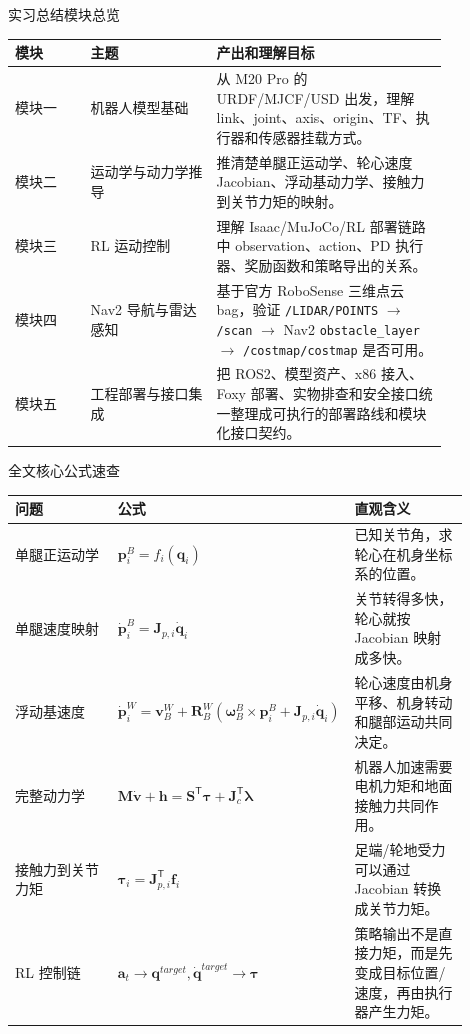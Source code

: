 \documentclass[UTF8,11pt,a4paper]{ctexart}
\newcommand{\T}{^{\mathsf T}}
\newcommand{\bs}[1]{\bm{#1}}
\begin{document}
\begin{conceptbox}{实习总结模块总览}
\begin{center}
\renewcommand{\arraystretch}{1.25}
\begin{tabular}{p{0.15\linewidth}p{0.25\linewidth}p{0.46\linewidth}}
\toprule
\textbf{模块} & \textbf{主题} & \textbf{产出和理解目标}\\
\midrule
模块一 & 机器人模型基础 &
从 M20 Pro 的 URDF/MJCF/USD 出发，理解 link、joint、axis、origin、TF、执行器和传感器挂载方式。\\
模块二 & 运动学与动力学推导 &
推清楚单腿正运动学、轮心速度 Jacobian、浮动基动力学、接触力到关节力矩的映射。\\
模块三 & RL 运动控制 &
理解 Isaac/MuJoCo/RL 部署链路中 observation、action、PD 执行器、奖励函数和策略导出的关系。\\
模块四 & Nav2 导航与雷达感知 &
基于官方 RoboSense 三维点云 bag，验证 \texttt{/LIDAR/POINTS} \(\rightarrow\) \texttt{/scan} \(\rightarrow\) Nav2 \texttt{obstacle\_layer} \(\rightarrow\) \texttt{/costmap/costmap} 是否可用。\\
模块五 & 工程部署与接口集成 &
把 ROS2、模型资产、x86 接入、Foxy 部署、实物排查和安全接口统一整理成可执行的部署路线和模块化接口契约。\\
\bottomrule
\end{tabular}
\end{center}
\end{conceptbox}

\begin{conceptbox}{全文核心公式速查}
\begin{center}
\renewcommand{\arraystretch}{1.25}
\begin{tabular}{p{0.30\linewidth}p{0.30\linewidth}p{0.30\linewidth}}
\toprule
\textbf{问题} & \textbf{公式} & \textbf{直观含义}\\
\midrule
单腿正运动学 &
\(\bs p_i^B=f_i(\bs q_i)\) &
已知关节角，求轮心在机身坐标系的位置。\\
单腿速度映射 &
\(\dot{\bs p}_i^B=\bs J_{p,i}\dot{\bs q}_i\) &
关节转得多快，轮心就按 Jacobian 映射成多快。\\
浮动基速度 &
\(\dot{\bs p}_i^W=\bs v_B^W+\bs R_B^W(\bs\omega_B^B\times\bs p_i^B+\bs J_{p,i}\dot{\bs q}_i)\) &
轮心速度由机身平移、机身转动和腿部运动共同决定。\\
完整动力学 &
\(\bs M\dot{\bs v}+\bs h=\bs S\T\bs\tau+\bs J_c\T\bs\lambda\) &
机器人加速需要电机力矩和地面接触力共同作用。\\
接触力到关节力矩 &
\(\bs\tau_i=\bs J_{p,i}\T\bs f_i\) &
足端/轮地受力可以通过 Jacobian 转换成关节力矩。\\
RL 控制链 &
\(\bs a_t\rightarrow \bs q^{target},\dot{\bs q}^{target}\rightarrow \bs\tau\) &
策略输出不是直接力矩，而是先变成目标位置/速度，再由执行器产生力矩。\\
\bottomrule
\end{tabular}
\end{center}
\end{conceptbox}
\end{document}
